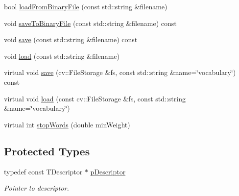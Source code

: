 \begin{DoxyCompactItemize}
bool \mbox{\hyperlink{class_d_bo_w2_1_1_templated_vocabulary_aa8c05732a3c2a063b0a8c1cbc418597a}{load\+From\+Binary\+File}} (const std\+::string \&filename)
\item 
void \mbox{\hyperlink{class_d_bo_w2_1_1_templated_vocabulary_a256d9aaeb91b2ca9e626e3bc76359579}{save\+To\+Binary\+File}} (const std\+::string \&filename) const
\item 
void \mbox{\hyperlink{class_d_bo_w2_1_1_templated_vocabulary_a92ca49bd6600bddbad145fb6e0543fa1}{save}} (const std\+::string \&filename) const
\item 
void \mbox{\hyperlink{class_d_bo_w2_1_1_templated_vocabulary_afdec2031c98b9109451b1454f73348b0}{load}} (const std\+::string \&filename)
\item 
virtual void \mbox{\hyperlink{class_d_bo_w2_1_1_templated_vocabulary_a3039529c46f02b795450f4fba2207339}{save}} (cv\+::\+File\+Storage \&fs, const std\+::string \&name=\char`\"{}vocabulary\char`\"{}) const
\item 
virtual void \mbox{\hyperlink{class_d_bo_w2_1_1_templated_vocabulary_a037ba240314ff30f3620fb4de6845c66}{load}} (const cv\+::\+File\+Storage \&fs, const std\+::string \&name=\char`\"{}vocabulary\char`\"{})
\item 
virtual int \mbox{\hyperlink{class_d_bo_w2_1_1_templated_vocabulary_a0b6721fde54bd8cd008f6a120398741e}{stop\+Words}} (double min\+Weight)
\end{DoxyCompactItemize}
\subsection*{Protected Types}
\begin{DoxyCompactItemize}
\item 
typedef const T\+Descriptor $\ast$ \mbox{\hyperlink{class_d_bo_w2_1_1_templated_vocabulary_a40913d67e369e6993c2eab80a968f829}{p\+Descriptor}}
\begin{DoxyCompactList}\small\item\em Pointer to descriptor. \end{DoxyCompactList}\end{DoxyCompactItemize}
